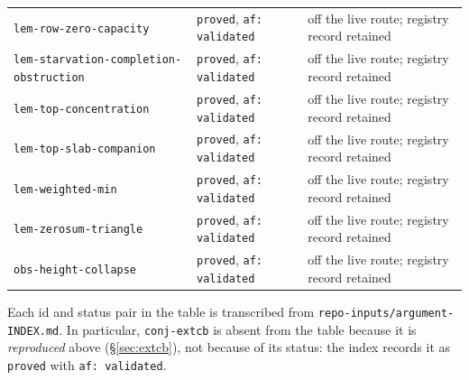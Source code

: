 \begin{longtable}{@{}p{}p{}p{}@{}}
\texttt{lem-row-zero-capacity} & \texttt{proved}, \texttt{af: validated} & off the live route; registry record retained \\
\texttt{lem-starvation-completion-obstruction} & \texttt{proved}, \texttt{af: validated} & off the live route; registry record retained \\
\texttt{lem-top-concentration} & \texttt{proved}, \texttt{af: validated} & off the live route; registry record retained \\
\texttt{lem-top-slab-companion} & \texttt{proved}, \texttt{af: validated} & off the live route; registry record retained \\
\texttt{lem-weighted-min} & \texttt{proved}, \texttt{af: validated} & off the live route; registry record retained \\
\texttt{lem-zerosum-triangle} & \texttt{proved}, \texttt{af: validated} & off the live route; registry record retained \\
\texttt{obs-height-collapse} & \texttt{proved}, \texttt{af: validated} & off the live route; registry record retained \\
\bottomrule
\end{longtable}

\noindent
Each id and status pair in the table is transcribed from
\texttt{repo-inputs/argument-INDEX.md}. In particular, \texttt{conj-extcb} is absent from
the table because it is \emph{reproduced} above (\S\ref{sec:extcb}), not because of its
status: the index records it as \texttt{proved} with \texttt{af: validated}.
